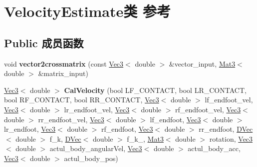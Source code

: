 \hypertarget{classVelocityEstimate}{}\section{Velocity\+Estimate类 参考}
\label{classVelocityEstimate}
\subsection*{Public 成员函数}
\begin{DoxyCompactItemize}
\item 
\mbox{\label{classVelocityEstimate_a9cf353e393f834f1ee1fcd27871b662f}} 
void {\bfseries vector2crossmatrix} (const \hyperlink{cppTypes_8h_a65c27bf97693676535dd0b30ea0ad399}{Vec3}$<$ double $>$ \&vector\+\_\+input, \hyperlink{cppTypes_8h_adb7d462b35d31f0b2583b3e230a2a2c3}{Mat3}$<$ double $>$ \&matrix\+\_\+input)
\item 
\mbox{\label{classVelocityEstimate_a008b3eb136ed2006728593d972aa186c}} 
\hyperlink{cppTypes_8h_a65c27bf97693676535dd0b30ea0ad399}{Vec3}$<$ double $>$ {\bfseries Cal\+Velocity} (bool L\+F\+\_\+\+C\+O\+N\+T\+A\+CT, bool L\+R\+\_\+\+C\+O\+N\+T\+A\+CT, bool R\+F\+\_\+\+C\+O\+N\+T\+A\+CT, bool R\+R\+\_\+\+C\+O\+N\+T\+A\+CT, \hyperlink{cppTypes_8h_a65c27bf97693676535dd0b30ea0ad399}{Vec3}$<$ double $>$ lf\+\_\+endfoot\+\_\+vel, \hyperlink{cppTypes_8h_a65c27bf97693676535dd0b30ea0ad399}{Vec3}$<$ double $>$ lr\+\_\+endfoot\+\_\+vel, \hyperlink{cppTypes_8h_a65c27bf97693676535dd0b30ea0ad399}{Vec3}$<$ double $>$ rf\+\_\+endfoot\+\_\+vel, \hyperlink{cppTypes_8h_a65c27bf97693676535dd0b30ea0ad399}{Vec3}$<$ double $>$ rr\+\_\+endfoot\+\_\+vel, \hyperlink{cppTypes_8h_a65c27bf97693676535dd0b30ea0ad399}{Vec3}$<$ double $>$ lf\+\_\+endfoot, \hyperlink{cppTypes_8h_a65c27bf97693676535dd0b30ea0ad399}{Vec3}$<$ double $>$ lr\+\_\+endfoot, \hyperlink{cppTypes_8h_a65c27bf97693676535dd0b30ea0ad399}{Vec3}$<$ double $>$ rf\+\_\+endfoot, \hyperlink{cppTypes_8h_a65c27bf97693676535dd0b30ea0ad399}{Vec3}$<$ double $>$ rr\+\_\+endfoot, \hyperlink{cppTypes_8h_adad69baca3c77d5f991be5d3c063fea7}{D\+Vec}$<$ double $>$ f\+\_\+k, \hyperlink{cppTypes_8h_adad69baca3c77d5f991be5d3c063fea7}{D\+Vec}$<$ double $>$ f\+\_\+k\+\_, \hyperlink{cppTypes_8h_adb7d462b35d31f0b2583b3e230a2a2c3}{Mat3}$<$ double $>$ rotation, \hyperlink{cppTypes_8h_a65c27bf97693676535dd0b30ea0ad399}{Vec3}$<$ double $>$ actul\+\_\+body\+\_\+angular\+Vel, \hyperlink{cppTypes_8h_a65c27bf97693676535dd0b30ea0ad399}{Vec3}$<$ double $>$ actul\+\_\+body\+\_\+acc, \hyperlink{cppTypes_8h_a65c27bf97693676535dd0b30ea0ad399}{Vec3}$<$ double $>$ actul\+\_\+body\+\_\+pos)
\end{DoxyCompactItemize}
